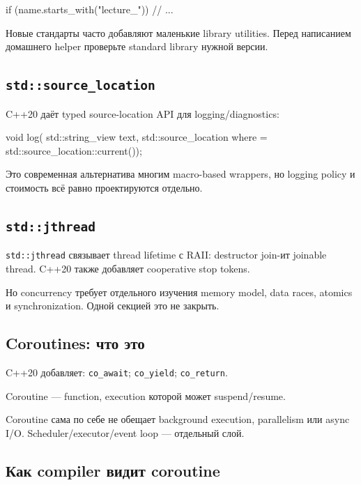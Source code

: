\begin{cppcode}
if (name.starts_with("lecture_")) {
    // ...
}
\end{cppcode}

Новые стандарты часто добавляют маленькие library utilities. Перед написанием
домашнего helper проверьте standard library нужной версии.

\subsection{\texttt{std::source\_location}}

C++20 даёт typed source-location API для logging/diagnostics:

\begin{cppcode}
void log(
    std::string_view text,
    std::source_location where =
        std::source_location::current());
\end{cppcode}

Это современная альтернатива многим macro-based wrappers, но logging policy и
стоимость всё равно проектируются отдельно.

\subsection{\texttt{std::jthread}}

\texttt{std::jthread} связывает thread lifetime с RAII: destructor join-ит
joinable thread. C++20 также добавляет cooperative stop tokens.

Но concurrency требует отдельного изучения memory model, data races, atomics и
synchronization. Одной секцией это не закрыть.

\subsection{Coroutines: что это}

C++20 добавляет:
\texttt{co\_await}; \texttt{co\_yield}; \texttt{co\_return}.

Coroutine --- function, execution которой может suspend/resume.

\begin{warningbox}
Coroutine сама по себе не обещает background execution, parallelism или async
I/O. Scheduler/executor/event loop --- отдельный слой.
\end{warningbox}

\subsection{Как compiler видит coroutine}

